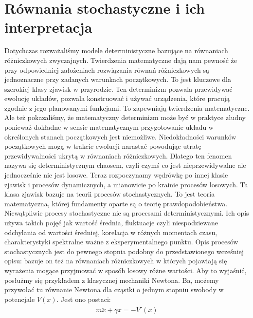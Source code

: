 \documentclass[a4paper,12pt,polish]{sphinxmanual}
\begin{document}
\section{Równania stochastyczne i ich interpretacja}
\label{ch3/chIII011::doc}\label{ch3/chIII011:rownania-stochastyczne-i-ich-interpretacja}
Dotychczas rozważaliśmy modele deterministyczne bazujące na równaniach różniczkowych zwyczajnych. Twierdzenia matematyczne dają nam pewność że przy odpowiednicj założeniach rozwiązania równań różniczkowych są jednoznaczne przy zadanych warunkach początkowych. To jest kluczowe dla szerokiej klasy zjawisk w przyrodzie. Ten determinizm pozwala przewidywać ewolucję układów, pozwala konstruować i używać urządzenia, które pracują zgodnie z jego planowanymi funkcjami. To zapewniają twierdzenia matematyczne. Ale też pokazaliśmy, że matematyczny determinizm może być w praktyce złudny ponieważ dokładne w sensie matematycznym przygotowanie układu w określonych stanach początkowych jest niemożliwe. Niedokładności warunków początkowych mogą w trakcie ewolucji narastać powodując utratę przewidywalności ukrytą w równaniach różniczkowych. Dlatego ten fenomen nazywa się deterministycznym chaosem, czyli czymś co jest nieprzewidywalne ale jednocześnie nie jest losowe. Teraz rozpoczynamy wędrówkę po innej klasie zjawisk i procesów dynamicznych, a mianowicie po krainie procesów losowych. Ta klasa zjawisk bazuje na teorii procesów stochastycznych. To jest teoria matematyczna, której fundamenty oparte są o teorię prawdopodobieństwa. Niewątpliwie procesy stochastyczne nie są procesami deterministycznymi. Ich opis używa takich pojęć jak wartość średnia, fluktuacje czyli niespodziewane odchylania od wartości średniej, korelacja w różnych momentach czasu, charakterystyki spektralne ważne z eksperymentalnego punktu. Opis procesów stochastycznych jest do pewnego stopnia podobny do przedstawionego wcześniej opisu: bazuje on też na równaniach różniczkowych w których pojawiają się wyrażenia mogące przyjmować w sposób losowy różne wartości. Aby to wyjaśnić, posłużmy się przykładem z klasycznej mechaniki Newtona. Ba, możemy przywołać tu równanie Newtona dla cząstki o jednym stopniu swobody w potencjale $V(x)$. Jest ono postaci:
\label{ch3/chIII011:equation-eqn1}\begin{gather}
\begin{split}m \ddot x + \gamma \dot x = -V'(x)\end{split}\label{ch3/chIII011-eqn1}
\end{gather}
\end{document}
